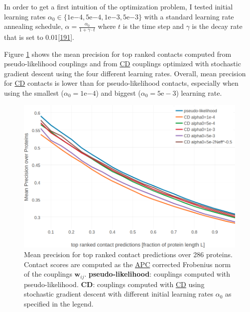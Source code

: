 \documentclass[11pt,a4paper,twoside]{book}
\newcommand{\eq}{\!=\!}
\newcommand{\wij}{\mathbf{w}_{ij}}
\theoremstyle{definition}
\theoremstyle{definition}
\theoremstyle{remark}
\begin{document}
In order to get a first intuition of the optimization problem, I tested
initial learning rates
\(\alpha_0 \in \{1\mathrm{e}{-4}, 5\mathrm{e}{-4}, 1\mathrm{e}{-3}, 5\mathrm{e}{-3}\}\)
with a standard learning rate annealing schedule,
\(\alpha = \frac{\alpha_0}{1 + \gamma \cdot t}\) where \(t\) is the time
step and \(\gamma\) is the decay rate that is set to
0.01{[}\protect\hyperlink{ref-Bottou2012}{191}{]}.

Figure \ref{fig:performance-cd-alphaopt} shows the mean precision for
top ranked contacts computed from pseudo-likelihood couplings and from
\protect\hyperlink{abbrev}{CD} couplings optimized with stochastic
gradient descent using the four different learning rates. Overall, mean
precision for \protect\hyperlink{abbrev}{CD} contacts is lower than for
pseudo-likelihood contacts, especially when using the smallest
(\(\alpha_0 \eq 1\mathrm{e}{-4}\)) and biggest
(\(\alpha_0 \eq 5\mathrm{e-}{3}\)) learning rate.










\begin{figure}

{\centering \includegraphics[width=0.9\linewidth]{img/full_likelihood/sgd/precision_vs_rank_learning_rates} 

}

\caption{Mean precision for top ranked
contact predictions over 286 proteins. Contact scores are computed as
the \protect\hyperlink{abbrev}{APC} corrected Frobenius norm of the
couplings \(\wij\). \textbf{pseudo-likelihood}: couplings computed with
pseudo-likelihood. \textbf{CD}: couplings computed with
\protect\hyperlink{abbrev}{CD} using stochastic gradient descent with
different initial learning rates \(\alpha_0\) as specified in the
legend.}\label{fig:performance-cd-alphaopt}
\end{figure}
\end{document}
